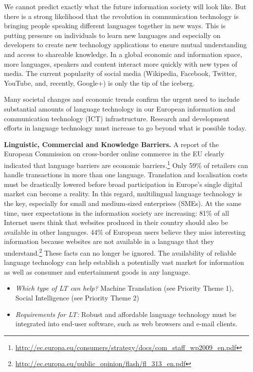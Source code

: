 \documentclass[10pt, plain]{../../metanetpaper}
\begin{document}
\begin{multicols}{2}
We cannot predict exactly what the future information society will look like. But there is a strong likelihood that the revolution in communication technology is bringing people speaking different languages together in new ways. This is putting pressure on individuals to learn new languages and especially on developers to create new technology applications to ensure mutual understanding and access to shareable knowledge. In a global economic and information space, more languages, speakers and content interact more quickly with new types of media. The current popularity of social media (Wikipedia, Facebook, Twitter, YouTube, and, recently, Google+) is only the tip of the iceberg.

Many societal changes and economic trends confirm the urgent need to include substantial amounts of language technology in our European information and communication technology (ICT) infrastructure. Research and development efforts in language technology must increase to go beyond what is possible today.

\textbf{Linguistic, Commercial and Knowledge Barriers.} A report of the European Commission on cross-border online commerce in the EU clearly indicated that language barriers are economic barriers.\footnote{\url{http://ec.europa.eu/consumers/strategy/docs/com_staff_wp2009_en.pdf}}  Only 59\% of retailers can handle transactions in more than one language. Translation and localisation costs must be drastically lowered before broad participation in Europe’s single digital market can become a reality. In this regard, multilingual language technology is the key, especially for small and medium-sized enterprises (SMEs). At the same time, user expectations in the information society are increasing: 81\% of all Internet users think that websites produced in their country should also be available in other languages. 44\% of European users believe they miss interesting information because websites are not available in a language that they understand.\footnote{\url{http://ec.europa.eu/public_opinion/flash/fl_313_en.pdf}} These facts can no longer be ignored. The availability of reliable language technology can help establish a potentially vast market for information as well as consumer and entertainment goods in any language.

\begin{itemize}
\item \emph{Which type of LT can help?} Machine Translation (see Priority Theme 1), Social Intelligence (see Priority Theme 2)
\item \emph{Requirements for LT:} Robust and affordable language technology must be integrated into end-user software, such as web browsers and e-mail clients. 
\end{itemize}


\end{multicols}
\end{document}
